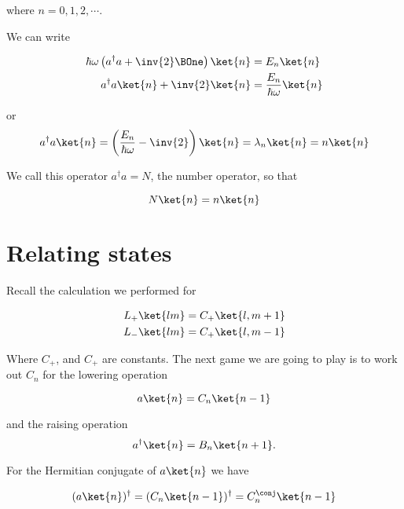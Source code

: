 where $n = 0, 1, 2, \cdots$.

We can write

\begin{align*}
\hbar \omega \left( a^\dagger a + \inv{2} \BOne \right) \ket{n} &= E_n \ket{n} \\
a^\dagger a \ket{n} + \inv{2} \ket{n} &= \frac{E_n}{\hbar \omega} \ket{n} \\
\end{align*}

or
\begin{equation}\label{eqn:PHY356FLecture11:170}
a^\dagger a \ket{n} = \left( \frac{E_n}{\hbar \omega} - \inv{2} \right) \ket{n} = \lambda_n \ket{n} = n \ket{n}
\end{equation}

We call this operator $a^\dagger a = N$, the number operator, so that

\begin{equation}\label{eqn:PHY356FLecture11:180}
N \ket{n} = n \ket{n}
\end{equation}

\section{Relating states}

Recall the calculation we performed for

\begin{align}\label{eqn:PHY356FLecture11:200}
L_{+} \ket{lm} &= C_{+} \ket{l, m+1} \\
L_{-} \ket{lm} &= C_{+} \ket{l, m-1}
\end{align}

Where $C_{+}$, and $C_{+}$ are constants.  The next game we are going to play is to work out $C_n$ for the lowering operation

\begin{equation}\label{eqn:PHY356FLecture11:210}
a\ket{n} = C_n \ket{n-1}
\end{equation}

and the raising operation
\begin{equation}\label{eqn:PHY356FLecture11:211}
a^\dagger \ket{n} = B_n \ket{n+1}.
\end{equation}

For the Hermitian conjugate of $a \ket{n}$ we have

\begin{equation}\label{eqn:PHY356FLecture11:220}
(a \ket{n})^\dagger = ( C_n \ket{n-1} )^\dagger = C_n^\conj \ket{n-1}
\end{equation}

